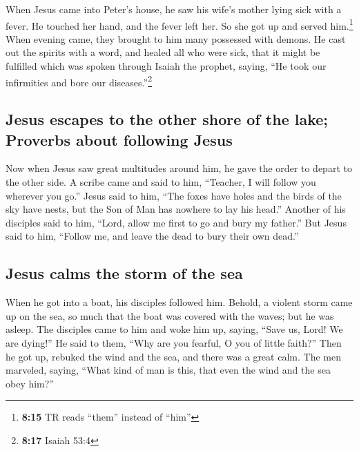  When Jesus came into Peter's house, he saw his wife's
mother lying sick with a fever.  He touched her hand, and
the fever left her. So she got up and served him.\footnote{\textbf{8:15}
  TR reads ``them'' instead of ``him''}  When evening
came, they brought to him many possessed with demons. He cast out the
spirits with a word, and healed all who were sick,  that
it might be fulfilled which was spoken through Isaiah the prophet,
saying, ``He took our infirmities and bore our diseases.''\footnote{\textbf{8:17}
  Isaiah 53:4}

\hypertarget{jesus-escapes-to-the-other-shore-of-the-lake-proverbs-about-following-jesus}{%
\subsection{Jesus escapes to the other shore of the lake; Proverbs about
following
Jesus}\label{jesus-escapes-to-the-other-shore-of-the-lake-proverbs-about-following-jesus}}

 Now when Jesus saw great multitudes around him, he gave
the order to depart to the other side.  A scribe came and
said to him, ``Teacher, I will follow you wherever you go.''
 Jesus said to him, ``The foxes have holes and the birds
of the sky have nests, but the Son of Man has nowhere to lay his head.''
 Another of his disciples said to him, ``Lord, allow me
first to go and bury my father.''  But Jesus said to him,
``Follow me, and leave the dead to bury their own dead.''

\hypertarget{jesus-calms-the-storm-of-the-sea}{%
\subsection{Jesus calms the storm of the
sea}\label{jesus-calms-the-storm-of-the-sea}}

 When he got into a boat, his disciples followed him.
 Behold, a violent storm came up on the sea, so much that
the boat was covered with the waves; but he was asleep. 
The disciples came to him and woke him up, saying, ``Save us, Lord! We
are dying!''  He said to them, ``Why are you fearful, O
you of little faith?'' Then he got up, rebuked the wind and the sea, and
there was a great calm.  The men marveled, saying, ``What
kind of man is this, that even the wind and the sea obey him?''

